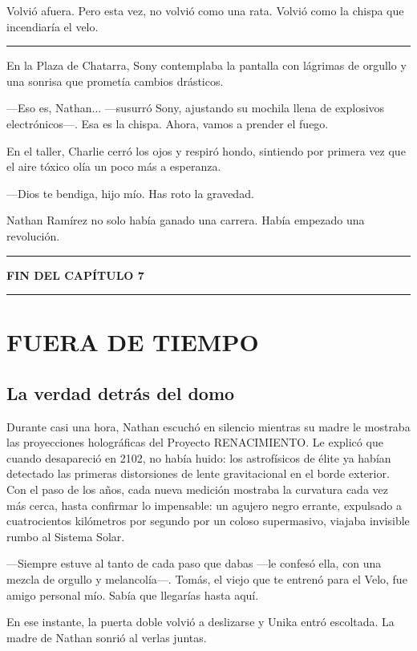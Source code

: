 \documentclass[12pt,a4paper]{book}
\begin{document}
Volvió afuera. Pero esta vez, no volvió como una rata. Volvió como la chispa que incendiaría el velo.

\bigskip
\noindent\rule{\textwidth}{0.4pt}
\bigskip

En la Plaza de Chatarra, Sony contemplaba la pantalla con lágrimas de orgullo y una sonrisa que prometía cambios drásticos.

---Eso es, Nathan... ---susurró Sony, ajustando su mochila llena de explosivos electrónicos---. Esa es la chispa. Ahora, vamos a prender el fuego.

En el taller, Charlie cerró los ojos y respiró hondo, sintiendo por primera vez que el aire tóxico olía un poco más a esperanza.

---Dios te bendiga, hijo mío. Has roto la gravedad.

Nathan Ramírez no solo había ganado una carrera. Había empezado una revolución.

\bigskip
\noindent\rule{\textwidth}{0.4pt}
\bigskip

\textbf{FIN DEL CAPÍTULO 7}


\bigskip
\noindent\rule{\textwidth}{0.4pt}
\bigskip

\chapter{FUERA DE TIEMPO}

\section*{La verdad detrás del domo}

Durante casi una hora, Nathan escuchó en silencio mientras su madre le mostraba las proyecciones holográficas del Proyecto RENACIMIENTO. Le explicó que cuando desapareció en 2102, no había huido: los astrofísicos de élite ya habían detectado las primeras distorsiones de lente gravitacional en el borde exterior. Con el paso de los años, cada nueva medición mostraba la curvatura cada vez más cerca, hasta confirmar lo impensable: un agujero negro errante, expulsado a cuatrocientos kilómetros por segundo por un coloso supermasivo, viajaba invisible rumbo al Sistema Solar.

---Siempre estuve al tanto de cada paso que dabas ---le confesó ella, con una mezcla de orgullo y melancolía---. Tomás, el viejo que te entrenó para el Velo, fue amigo personal mío. Sabía que llegarías hasta aquí.

En ese instante, la puerta doble volvió a deslizarse y Unika entró escoltada. La madre de Nathan sonrió al verlas juntas.
\end{document}
